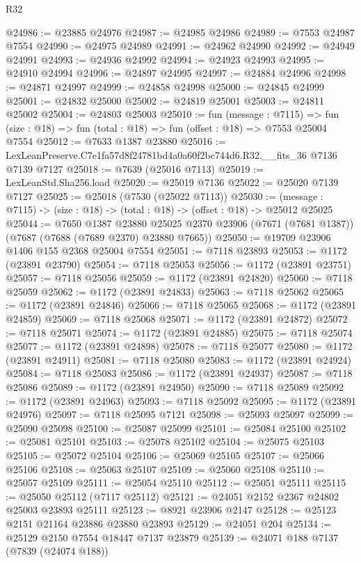 \begin{lexlean}{R32}
\begin{coremodule}
@24986 := @23885 @24976
@24987 := @24985 @24986
@24989 := @7553 @24987 @7554
@24990 := @24975 @24989
@24991 := @24962 @24990
@24992 := @24949 @24991
@24993 := @24936 @24992
@24994 := @24923 @24993
@24995 := @24910 @24994
@24996 := @24897 @24995
@24997 := @24884 @24996
@24998 := @24871 @24997
@24999 := @24858 @24998
@25000 := @24845 @24999
@25001 := @24832 @25000
@25002 := @24819 @25001
@25003 := @24811 @25002
@25004 := @24803 @25003
@25010 := fun (message : @7115) =>
  fun (size : @18) => fun (total : @18) => fun (offset : @18) => @7553 @25004 @7554
@25012 := @7633 @1387 @23880
@25016 := LexLeanPreserve.C7e1fa57d8f24781bd4a0a60f2bc744d6.R32.__fits_36 @7136 @7139 @7127
@25018 := @7639 (@25016 @7113)
@25019 := LexLeanStd.Sha256.load
@25020 := @25019 @7136
@25022 := @25020 @7139 @7127
@25025 := @25018 (@7530 (@25022 @7113))
@25030 := (message : @7115) -> (size : @18) -> (total : @18) -> (offset : @18) -> @25012 @25025
@25044 := @7650
    @1387
    @23880
    @25025
    @2370
    @23906
    (@7671 (@7681 @1387))
    (@7687 (@7688 (@7689 @2370) @23880 @7665))
@25050 := @19709 @23906 @1406 @155 @2368 @25004 @7554
@25051 := @7118 @23893
@25053 := @1172 (@23891 @23790)
@25054 := @7118 @25053
@25056 := @1172 (@23891 @23751)
@25057 := @7118 @25056
@25059 := @1172 (@23891 @24820)
@25060 := @7118 @25059
@25062 := @1172 (@23891 @24833)
@25063 := @7118 @25062
@25065 := @1172 (@23891 @24846)
@25066 := @7118 @25065
@25068 := @1172 (@23891 @24859)
@25069 := @7118 @25068
@25071 := @1172 (@23891 @24872)
@25072 := @7118 @25071
@25074 := @1172 (@23891 @24885)
@25075 := @7118 @25074
@25077 := @1172 (@23891 @24898)
@25078 := @7118 @25077
@25080 := @1172 (@23891 @24911)
@25081 := @7118 @25080
@25083 := @1172 (@23891 @24924)
@25084 := @7118 @25083
@25086 := @1172 (@23891 @24937)
@25087 := @7118 @25086
@25089 := @1172 (@23891 @24950)
@25090 := @7118 @25089
@25092 := @1172 (@23891 @24963)
@25093 := @7118 @25092
@25095 := @1172 (@23891 @24976)
@25097 := @7118 @25095 @7121
@25098 := @25093 @25097
@25099 := @25090 @25098
@25100 := @25087 @25099
@25101 := @25084 @25100
@25102 := @25081 @25101
@25103 := @25078 @25102
@25104 := @25075 @25103
@25105 := @25072 @25104
@25106 := @25069 @25105
@25107 := @25066 @25106
@25108 := @25063 @25107
@25109 := @25060 @25108
@25110 := @25057 @25109
@25111 := @25054 @25110
@25112 := @25051 @25111
@25115 := @25050 @25112 (@7117 @25112)
@25121 := @24051 @2152 @2367 @24802 @25003 @23893 @25111
@25123 := @8921 @23906 @2147
@25128 := @25123 @2151 @21164 @23886 @23880 @23893
@25129 := @24051 @204
@25134 := @25129 @2150 @7554 @18447 @7137 @23879
@25139 := @24071 @188 @7137 (@7839 (@24074 @188))

\end{coremodule}
\end{lexlean}
